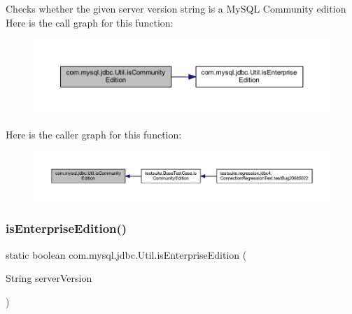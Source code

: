Checks whether the given server version string is a My\+S\+QL Community edition Here is the call graph for this function\+:
\nopagebreak
\begin{figure}[H]
\begin{center}
\leavevmode
\includegraphics[width=350pt]{classcom_1_1mysql_1_1jdbc_1_1_util_ab577aaf14859ab359307da29c26bff32_cgraph}
\end{center}
\end{figure}
Here is the caller graph for this function\+:
\nopagebreak
\begin{figure}[H]
\begin{center}
\leavevmode
\includegraphics[width=350pt]{classcom_1_1mysql_1_1jdbc_1_1_util_ab577aaf14859ab359307da29c26bff32_icgraph}
\end{center}
\end{figure}
\mbox{\label{classcom_1_1mysql_1_1jdbc_1_1_util_a0baaeeb5b7526fe807869f6941b77a27}} 
\subsubsection{\texorpdfstring{is\+Enterprise\+Edition()}{isEnterpriseEdition()}}
{\footnotesize\ttfamily static boolean com.\+mysql.\+jdbc.\+Util.\+is\+Enterprise\+Edition (\begin{DoxyParamCaption}\item[{String}]{server\+Version }\end{DoxyParamCaption})\hspace{0.3cm}{\ttfamily [static]}}

